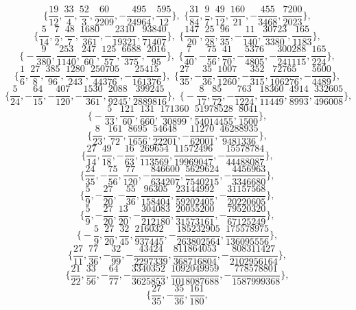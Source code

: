 \documentclass [11pt] {article}
\begin{document}
{\footnotesize

$$ \Big\{ \frac{19}{12}, \frac{33}{4}, \frac{52}{3}, \frac{60}{2209},
-\frac{495}{24964}, \frac{595}{12} \Big\}, \,\,
 \Big\{ \frac{31}{84}, \frac{9}{7}, \frac{49}{12}, \frac{160}{21},
-\frac{455}{3468}, \frac{7200}{2023} \Big\}, $$
$$ \Big\{ \frac{5}{14}, \frac{7}{2}, \frac{48}{7}, \frac{1680}{361},
-\frac{2310}{19321}, \frac{93840}{71407} \Big\}, \,\,
 \Big\{ \frac{147}{20}, \frac{25}{28}, \frac{96}{35},
-\frac{11}{140}, \frac{30723}{3380}, \frac{165}{1183} \Big\}, $$
$$ \Big\{ -\frac{9}{380}, \frac{253}{1140}, \frac{247}{60},
\frac{125}{57}, \frac{6688}{375}, \frac{2016}{95} \Big\}, \,\,
 \Big\{ \frac{7}{40}, -\frac{75}{56}, \frac{41}{70},
-\frac{5376}{4805}, -\frac{300288}{241115}, \frac{165}{224} \Big\}, $$
$$ \Big\{ \frac{1}{6}, \frac{27}{8}, \frac{385}{96}, \frac{1280}{243},
\frac{250705}{44376}, -\frac{25415}{161376} \Big\}, \,\,
 \Big\{ \frac{27}{35}, -\frac{35}{36}, \frac{1007}{1260},
-\frac{352}{315}, \frac{72765}{106276}, -\frac{5600}{4489} \Big\}, $$
$$ \Big\{ \frac{5}{24}, -\frac{64}{15}, -\frac{407}{120},
-\frac{1530}{361}, \frac{2088}{9245}, \frac{399245}{2889816} \Big\}, \,\,
 \Big\{ -\frac{8}{17}, \frac{85}{72}, -\frac{763}{1224},
\frac{18360}{11449}, \frac{4914}{8993}, \frac{332605}{496008} \Big\}, $$
$$ \Big\{ -\frac{5}{33}, \frac{121}{60}, \frac{131}{660},
\frac{171360}{30899}, \frac{51978528}{54014455}, \frac{8041}{1500} \Big\}, $$
$$ \Big\{ \frac{8}{23}, \frac{161}{72}, \frac{8695}{1656},
\frac{54648}{22201}, -\frac{11270}{62001}, \frac{46288935}{9481336} \Big\}, $$
$$ \Big\{ \frac{27}{14}, \frac{49}{18}, -\frac{16}{63}, \frac{269654}{113569},
\frac{11572496}{19969047}, -\frac{15578784}{44488087} \Big\}, $$
$$ \Big\{ \frac{24}{35}, -\frac{75}{56}, \frac{77}{120}, -\frac{846600}{634207},
\frac{5629624}{7540215}, -\frac{4456963}{3346680}  \Big\}, $$
$$ \Big\{ \frac{5}{9}, -\frac{27}{20}, -\frac{55}{36}, \frac{96305}{158404},
\frac{23144992}{59202405}, -\frac{31157568}{20220605} \Big\}, $$
$$ \Big\{ \frac{5}{9}, -\frac{27}{20}, \frac{13}{20}, -\frac{304083}{212180},
\frac{20055200}{31573161}, -\frac{79520320}{67125249} \Big\}, $$
$$ \Big\{ -\frac{5}{9}, \frac{27}{20}, \frac{32}{45}, \frac{216032}{937445},
-\frac{185232905}{263802564}, \frac{175578975}{136095556} \Big\}, $$
$$ \Big\{ \frac{27}{11}, \frac{77}{36}, -\frac{32}{99}, -\frac{43424}{2297339},
\frac{811864053}{368716804}, -\frac{808311427}{2102956164} \Big\}, $$
$$ \Big\{ \frac{21}{22}, \frac{33}{56}, -\frac{64}{77},
-\frac{3340352}{3625853}, \frac{1092049959}{1018087688}, -\frac{778578801}{1587999368} \Big\}, $$
$$  \Big\{ \frac{27}{35}, -\frac{35}{36}, \frac{161}{180},
$$}
\end{document}

